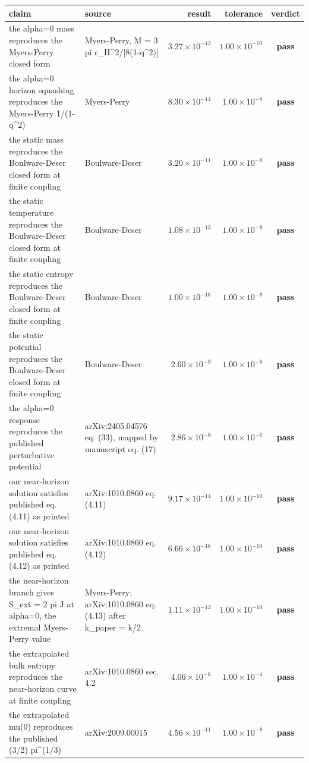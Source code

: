\documentclass[11pt,a4paper]{article}
\newcommand{\PASS}{\textcolor{pass}{\textbf{pass}}}
\begin{document}
\begin{longtable}{@{}L{.38\textwidth}L{.24\textwidth}rrc@{}}
\toprule
claim & source & result & tolerance & verdict \\
\midrule\endhead
the alpha=0 mass reproduces the Myers-Perry closed form & Myers-Perry, M = 3 pi r\_H\textasciicircum{}2/[8(1-q\textasciicircum{}2)] & $3.27\times10^{-13}$ & $1.00\times10^{-10}$ & \PASS \\
the alpha=0 horizon squashing reproduces the Myers-Perry 1/(1-q\textasciicircum{}2) & Myers-Perry & $8.30\times10^{-14}$ & $1.00\times10^{-8}$ & \PASS \\
the static mass reproduces the Boulware-Deser closed form at finite coupling & Boulware-Deser & $3.20\times10^{-11}$ & $1.00\times10^{-8}$ & \PASS \\
the static temperature reproduces the Boulware-Deser closed form at finite coupling & Boulware-Deser & $1.08\times10^{-13}$ & $1.00\times10^{-8}$ & \PASS \\
the static entropy reproduces the Boulware-Deser closed form at finite coupling & Boulware-Deser & $1.00\times10^{-16}$ & $1.00\times10^{-8}$ & \PASS \\
the static potential reproduces the Boulware-Deser closed form at finite coupling & Boulware-Deser & $2.60\times10^{-9}$ & $1.00\times10^{-8}$ & \PASS \\
the alpha=0 response reproduces the published perturbative potential & arXiv:2405.04576 eq. (33), mapped by manuscript eq. (17) & $2.86\times10^{-8}$ & $1.00\times10^{-6}$ & \PASS \\
our near-horizon solution satisfies published eq. (4.11) as printed & arXiv:1010.0860 eq. (4.11) & $9.17\times10^{-14}$ & $1.00\times10^{-10}$ & \PASS \\
our near-horizon solution satisfies published eq. (4.12) as printed & arXiv:1010.0860 eq. (4.12) & $6.66\times10^{-16}$ & $1.00\times10^{-10}$ & \PASS \\
the near-horizon branch gives S\_ext = 2 pi J at alpha=0, the extremal Myers-Perry value & Myers-Perry; arXiv:1010.0860 eq. (4.13) after k\_paper = k/2 & $1.11\times10^{-12}$ & $1.00\times10^{-10}$ & \PASS \\
the extrapolated bulk entropy reproduces the near-horizon curve at finite coupling & arXiv:1010.0860 sec. 4.2 & $4.06\times10^{-6}$ & $1.00\times10^{-4}$ & \PASS \\
the extrapolated mu(0) reproduces the published (3/2) pi\textasciicircum{}(1/3) & arXiv:2009.00015 & $4.56\times10^{-11}$ & $1.00\times10^{-8}$ & \PASS \\

\end{longtable}
\end{document}
